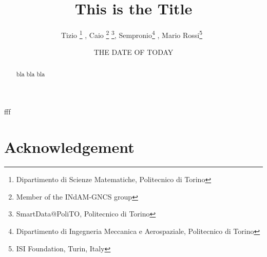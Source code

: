 \documentclass[a4paper,openany,10pt]{article}
\title{This is the Title}
\author{Tizio \thanks{Dipartimento di Scienze Matematiche, Politecnico di Torino} \footnotemark[2] \footnotemark[3], Caio  \footnotemark[1] \thanks{Member of the INdAM-GNCS group} \thanks{SmartData@PoliTO, Politecnico di Torino}, Sempronio\thanks{Dipartimento di Ingegneria Meccanica e Aerospaziale, Politecnico di Torino} \footnotemark[2], Mario Rossi\thanks{ISI Foundation, Turin, Italy} \,\footnotemark[1] \footnotemark[3]}
\date{THE DATE OF TODAY} %
\begin{document}
\maketitle




\begin{abstract}
bla bla bla
\end{abstract}







%

fff





%









\section*{Acknowledgement}



\printbibliography
\end{document}

